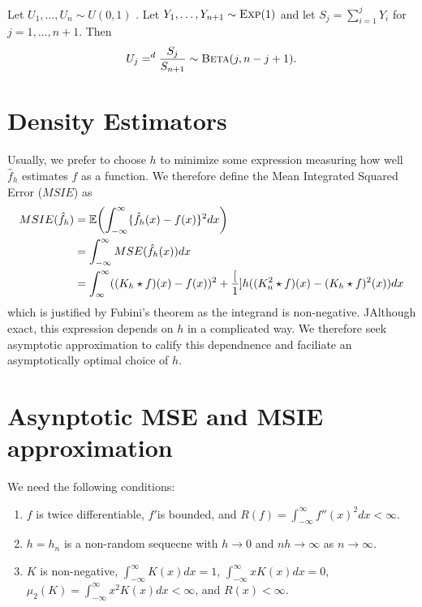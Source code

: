 \begin{proposition}
  Let $U_{1}, \dots, U_{n} \sim U(0, 1)$ \iid.  Let $Y_{1}, \dots,
  Y_{n+1} \sim \textsc{Exp}(1)$ \iid and let $S_{j} = \sum_{i=1}^{j}
  Y_{i}$ for $j = 1, \dots, n+1$.  Then
  \begin{align}
    \label{eq:13}
    U_{j} =^{d} \frac{S_{j}}{S_{n+1}} \sim \textsc{Beta}(j, n-j+1).
  \end{align}
\end{proposition}


\section{Density Estimators}
\label{sec:density-estimators}

Usually, we prefer to choose $h$ to minimize some expression measuring
how well $\hat f_{h}$ estimates $f$ as a function.  We therefore
define the Mean Integrated Squared Error ($MSIE$) as
\begin{align}
  \label{eq:14}
  MSIE(\hat f_{h}) &= \E{\int_{-\infty}^{\infty} \{ \hat f_{h}(x) -
    f(x) \}^{2} dx} \\
  &= \int_{-\infty}^{\infty} MSE(\hat f_{h}(x)) dx \\
  &= \int_{\infty}^{\infty} ((K_{h} \star f)(x) - f(x))^{2} +
  \frac[1]{h} ((K^{2}_{n} \star f)(x) - (K_{h} \star f)^{2}(x)) dx
\end{align} which is justified by Fubini's theorem as the integrand
is non-negative.
JAlthough exact, this expression depends on $h$ in a complicated way.
We therefore seek asymptotic approximation to calify this dependnence
and faciliate an asymptotically optimal choice of $h$.

\section{Asynptotic MSE and MSIE approximation}
\label{sec:asynptotic-mse-msie}

We need the following conditions:
\begin{enumerate}
\item \label{item:4} $f$ is twice differentiable, $f'$is bounded, and $R(f) =
  \int_{-\infty}^{\infty} f''(x)^{2} dx < \infty$.
\item \label{item:5} $h = h_{n}$ is a non-random sequecne with $h \rightarrow 0$ and
  $nh \rightarrow \infty$ as $n \rightarrow \infty$.
\item \label{item:6} $K$ is non-negative, $\int_{-\infty}^{\infty} K(x) dx = 1$,
  $\int_{-\infty}^{\infty} x K(x) dx = 0$, $\mu_{2}(K) =
  \int_{-\infty}^{\infty} x^{2} K(x) dx < \infty$, and $R(x) < \infty$.
\end{enumerate}

